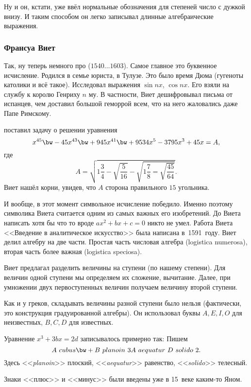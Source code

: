 \documentclass[a4paper,oneside,fleqn,10pt]{article}
\newcommand{\pe}[2]{${#1}\ldots{#2}$}
\begin{document}
Ну и он, кстати, уже ввёл нормальные обозначения для степеней число с дужкой внизу.
И таким способом он легко записывал длинные алгебраические выражения.

\subsubsection{Франсуа Виет}

Так, ну теперь немного про  (\pe{1540}{1603}). Самое главное это буквенное исчисление.
Родился в семье юриста, в Тулузе. Это было время Дюма (гугеноты католики и всё такое).
Исследовал выражения $\sin nx$, $\cos nx$. Его взяли на службу к королю Генриху $n$ му.
В частности, Виет дешифровывал письма от испанцев, чем доставил большой геморрой всем,
что на него жаловались даже Папе Римскому.

 поставил задачу о решении уравнения
$$x^{45} \bw- 45x^{43} \bw+ 945x^{41} \bw+ 9534x^5 -3795x^3 + 45x = A,$$
где
$$A = \sqrt{1\frac34-\sqrt{\frac{5}{16}} - \sqrt{1\frac78 = \sqrt{\frac{45}{64}}}}.$$
Виет нашёл корни, увидев, что $A$ сторона правильного $15$ угольника.

И вообще, в этот момент символьное исчисление победило.
Именно поэтому символика Виета считается одним из самых важных его изобретений.
До Виета написать хотя бы что то вроде $ax^2 + bx + c = 0$ никто не умел. Работа Виета
<<Введение в аналитическое искусство>> была написана в~1591~году. Виет делил алгебру
на две части. Простая часть числовая алгебра (logistica numerosa), вторая часть
более важная (logistica speciosa).

Виет предлагал разделить величины на ступени (по нашему степени).
Для величин одной ступени мы определяем их сложение, вычитание.
Далее, при умножении двух первоступенных величин получаем величину второй ступени.

Как и у греков, складывать величины разной ступени было нельзя (фактически, это конструкция
градуированной алгебры). Он использовал буквы $A, E, I, O$ для неизвестных, $B, C, D$ для известных.

\begin{ex}
Уравнение $x^3 + 3bx = 2d$ записывалось примерно так:
Пишем $$A~cubus\bw+B~planoin~3A~aequatur~D~solido~2.$$
Здесь <<\emph{planoin}>> плоский, <<\emph{aequatur}>> равенство, <<\emph{solido}>> телесный.
\end{ex}

\begin{note}
Знаки <<плюс>> и <<минус>> были введены уже в 15~веке каким-то Яном.
\end{note}
\end{document}
